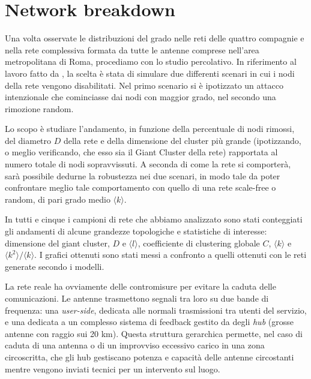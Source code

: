 \clearpage
\section{Network breakdown}
\label{sec:attaack}

Una volta osservate le distribuzioni del grado nelle reti delle quattro compagnie e nella rete complessiva formata da tutte le antenne comprese nell'area metropolitana di Roma, procediamo con lo studio percolativo. In riferimento al lavoro fatto da \textcite{Barbalbert2000}, la scelta è stata di simulare due differenti scenari in cui i nodi della rete vengono disabilitati. Nel primo scenario si è ipotizzato un attacco intenzionale che cominciasse dai nodi con maggior grado, nel secondo una rimozione random. 

Lo scopo è studiare l'andamento, in funzione della percentuale di nodi rimossi, del diametro $D$ della rete e della dimensione del cluster più grande (ipotizzando, o meglio verificando, che esso sia il Giant Cluster della rete) rapportata al numero totale di nodi sopravvissuti. A seconda di come la rete si comporterà, sarà possibile dedurne la robustezza nei due scenari, in modo tale da poter confrontare meglio tale comportamento con quello di una rete scale-free o random, di pari grado medio $\langle k \rangle$.

In tutti e cinque i campioni di rete che abbiamo analizzato sono stati conteggiati gli andamenti di alcune grandezze topologiche e statistiche di interesse: dimensione del giant cluster, $D$ e $\langle l \rangle$, coefficiente di clustering globale $C$, $\langle k \rangle$ e $\langle k^2 \rangle/\langle k \rangle$. I grafici ottenuti sono stati messi a confronto a quelli ottenuti con le reti generate secondo i modelli.

La rete reale ha ovviamente delle contromisure per evitare la caduta delle comunicazioni. Le antenne trasmettono segnali tra loro su due bande di frequenza: una \emph{user-side}, dedicata alle normali trasmissioni tra utenti del servizio, e una dedicata a un complesso sistema di feedback gestito da degli \emph{hub} (grosse antenne con raggio sui 20 km). Questa struttura gerarchica permette, nel caso di caduta di una antenna o di un improvviso eccessivo carico in una zona circoscritta, che gli hub gestiscano potenza e capacità delle antenne circostanti mentre vengono inviati tecnici per un intervento sul luogo.

